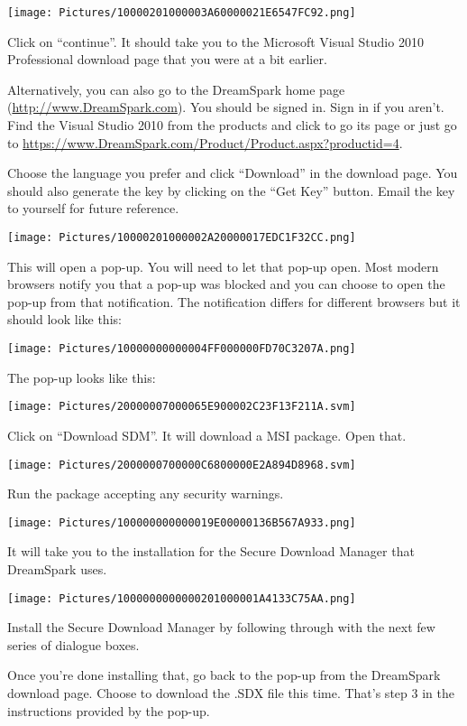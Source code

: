 \documentclass[
]{article}
\begin{document}
\texttt{[image: Pictures/10000201000003A60000021E6547FC92.png]}

Click on ``continue''. It should take you to the Microsoft Visual Studio
2010 Professional download page that you were at a bit earlier.

Alternatively, you can also go to the DreamSpark home page
(\href{http://www.dreamspark.com/}{http://www.DreamSpark.com}). You
should be signed in. Sign in if you aren't. Find the Visual Studio 2010
from the products and click to go its page or just go to
\url{https://www.DreamSpark.com/Product/Product.aspx?productid=4}.

Choose the language you prefer and click ``Download'' in the download
page. You should also generate the key by clicking on the ``Get Key''
button. Email the key to yourself for future reference.

\texttt{[image: Pictures/10000201000002A20000017EDC1F32CC.png]}

This will open a pop-up. You will need to let that pop-up open. Most
modern browsers notify you that a pop-up was blocked and you can choose
to open the pop-up from that notification. The notification differs for
different browsers but it should look like this:

\texttt{[image: Pictures/10000000000004FF000000FD70C3207A.png]}

The pop-up looks like this:

\texttt{[image: Pictures/20000007000065E900002C23F13F211A.svm]}

Click on ``Download SDM''. It will download a MSI package. Open that.

\texttt{[image: Pictures/2000000700000C6800000E2A894D8968.svm]}

Run the package accepting any security warnings.

\texttt{[image: Pictures/100000000000019E00000136B567A933.png]}

It will take you to the installation for the Secure Download Manager
that DreamSpark uses.

\texttt{[image: Pictures/1000000000000201000001A4133C75AA.png]}

Install the Secure Download Manager by following through with the next
few series of dialogue boxes.

Once you're done installing that, go back to the pop-up from the
DreamSpark download page. Choose to download the .SDX file this time.
That's step 3 in the instructions provided by the pop-up.
\end{document}
